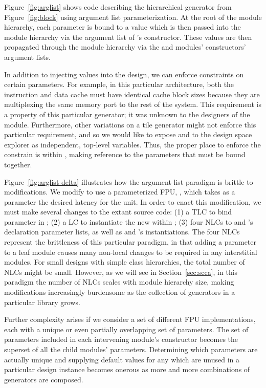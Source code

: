 Figure~\ref{fig:arglist} shows code describing the hierarchical  generator from Figure~\ref{fig:block} using argument list parameterization.
At the root of the module hierarchy, each parameter is bound to a value which is then passed into the module hierarchy via the argument list of 's constructor.
These values are then propagated through the module hierarchy via the  and  modules' constructors' argument lists.

In addition to injecting values into the design, we can enforce constraints on certain parameters.
For example, in this particular  architecture, both the instruction and data cache must have identical cache block sizes
because they are multiplexing the same memory port to the rest of the system.
This requirement is a property of this particular  generator; it was unknown to the designers of the  module.
Furthermore, other variations on a tile generator might not enforce this particular requirement, and so we would like to expose
 and  to the design space explorer as independent, top-level variables.
Thus, the proper place to enforce the constrain is within , making reference to the parameters that must be bound together.

Figure~\ref{fig:arglist-delta} illustrates how the argument list paradigm is brittle to modifications. 
We modify  to use a parameterized FPU, , which takes as a parameter the desired latency for the unit.
In order to enact this modification, we must make several changes to the extant source code:
(1) a TLC to bind parameter  in ;
(2) a LC to instantiate the new  within ;
(3) four NLCs to  and 's declaration parameter lists, as well as  and 's instantiations.
The four NLCs represent the brittleness of this particular paradigm, in that adding a parameter to a leaf module causes many non-local changes to be required in any interstitial modules.
For small designs with simple class hierarchies, the total number of NLCs might be small.
However, as we will see in Section~\ref{sec:scca}, in this paradigm the number of NLCs scales with module hierarchy size, making modifications increasingly burdensome
as the collection of generators in a particular library grows.

Further complexity arises if we consider a set of different FPU implementations, each with a unique or even partially overlapping set of parameters.
The set of parameters included in each intervening module's constructor becomes the superset of all the child modules' parameters.
Determining which parameters are actually unique and supplying default values for any which are unused in a particular design instance becomes onerous
as more and more combinations of generators are composed.

